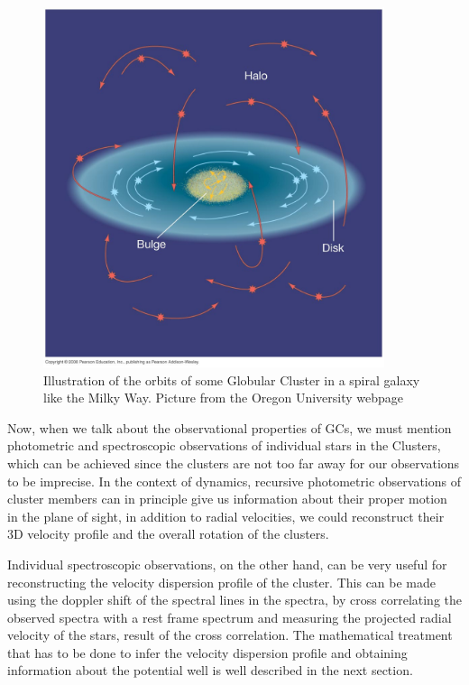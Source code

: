 \begin{figure}[H]
\centering
\includegraphics[width=10cm]{images/orbits_gcs.jpg}
\caption[Illustration of the orbits of Globular Clusters around a spiral galaxy]{Illustration of the orbits of some Globular Cluster in a spiral galaxy like the Milky Way. Picture from the Oregon University webpage}
\end{figure}

Now, when we talk about the observational properties of GCs, we must mention photometric and spectroscopic observations of individual stars in the Clusters, which can be achieved since the clusters are not too far away for our observations to be imprecise. In the context of dynamics, recursive photometric observations of cluster members can in principle give us information about their proper motion in the plane of sight, in addition to radial velocities, we could reconstruct their 3D velocity profile and the overall rotation of the clusters. 

Individual spectroscopic observations, on the other hand, can be very useful for reconstructing the velocity dispersion profile of the cluster. This can be made using the doppler shift of the spectral lines in the spectra, by cross correlating the observed spectra with a rest frame spectrum and measuring the projected radial velocity of the stars, result of the cross correlation. The mathematical treatment that has to be done to infer the velocity dispersion profile and obtaining information about the potential well is well described in the next section.

